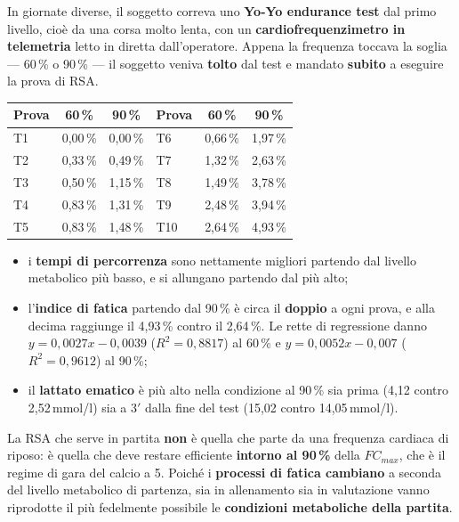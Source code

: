 In giornate diverse, il soggetto correva uno \textbf{Yo-Yo endurance test} dal primo livello, cioè
da una corsa molto lenta, con un \textbf{cardiofrequenzimetro in telemetria} letto in diretta
dall'operatore. Appena la frequenza toccava la soglia --- 60\,\% o 90\,\% --- il soggetto veniva
\textbf{tolto} dal test e mandato \textbf{subito} a eseguire la prova di RSA.

\begin{table}[htbp]
  \centering
  \small
  \renewcommand{\arraystretch}{1.3}
  \begin{tabularx}{\textwidth}{|X|c|c|X|c|c|}
    \hline
    \textbf{Prova} & \textbf{60\,\%} & \textbf{90\,\%} &
    \textbf{Prova} & \textbf{60\,\%} & \textbf{90\,\%} \\
    \hline
    T1 & 0,00\,\% & 0,00\,\% & T6 & 0,66\,\% & 1,97\,\% \\
    \hline
    T2 & 0,33\,\% & 0,49\,\% & T7 & 1,32\,\% & 2,63\,\% \\
    \hline
    T3 & 0,50\,\% & 1,15\,\% & T8 & 1,49\,\% & 3,78\,\% \\
    \hline
    T4 & 0,83\,\% & 1,31\,\% & T9 & 2,48\,\% & 3,94\,\% \\
    \hline
    T5 & 0,83\,\% & 1,48\,\% & T10 & 2,64\,\% & 4,93\,\% \\
    \hline
  \end{tabularx}
\end{table}

\begin{itemize}
  \item i \textbf{tempi di percorrenza} sono nettamente migliori partendo dal livello metabolico
    più basso, e si allungano partendo dal più alto;
  \item l'\textbf{indice di fatica} partendo dal 90\,\% è circa il \textbf{doppio} a ogni prova, e
    alla decima raggiunge il 4,93\,\% contro il 2,64\,\%. Le rette di regressione danno
    $y = 0,0027x - 0,0039$ ($R^2 = 0,8817$) al 60\,\% e $y = 0,0052x - 0,007$
    ($R^2 = 0,9612$) al 90\,\%;
  \item il \textbf{lattato ematico} è più alto nella condizione al 90\,\% sia prima
    (4,12 contro 2,52\,mmol/l) sia a 3$'$ dalla fine del test (15,02 contro 14,05\,mmol/l).
\end{itemize}

La RSA che serve in partita \textbf{non} è quella che parte da una frequenza cardiaca di riposo: è
quella che deve restare efficiente \textbf{intorno al 90\,\%} della $FC_{max}$, che è il regime di
gara del calcio a 5. Poiché i \textbf{processi di fatica cambiano} a seconda del livello metabolico
di partenza, sia in allenamento sia in valutazione vanno riprodotte il più fedelmente possibile le
\textbf{condizioni metaboliche della partita}.


